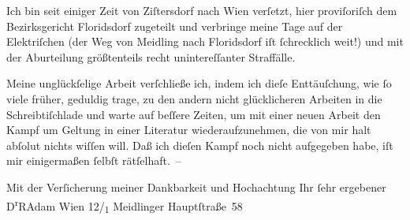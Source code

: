 \pstart
           Ich bin seit einiger Zeit von Ziſtersdorf nach
                  Wien verſetzt, hier proviſoriſch dem Bezirksgericht Floridsdorf zugeteilt und verbringe
               meine Tage auf der Elektriſchen (der Weg von Meidling nach Floridsdorf iſt ſchrecklich
               weit!) und mit der Aburteilung größtenteils recht unintereſſanter Straffälle.\pend
           
\pstart
           Meine unglückſelige Arbeit verſchließe ich, indem ich dieſe Enttäuſchung, wie ſo
               viele früher, geduldig trage, zu den andern nicht glücklicheren Arbeiten in die
               Schreibtiſchlade und warte auf beſſere Zeiten, um mit einer neuen Arbeit den Kampf um
               Geltung in einer Literatur wiederaufzunehmen, die von mir halt abſolut nichts wiſſen
               will. Daß ich die{\pb}ſen Kampf noch nicht aufgegeben
               habe, iſt mir einigermaßen ſelbſt rätſelhaft. –\pend
           
\pstart
           Mit der Verſicherung meiner Dankbarkeit und Hochachtung Ihr ſehr ergebener\pend
           \pstart \spacefill\mbox{D\textsuperscript{r}RAdam}\pend{}
\pstart
           \noindent{}Wien 12/\textsubscript{1} Meidlinger
                     Hauptſtraße 58\pend
           \endnumbering{}  
      
